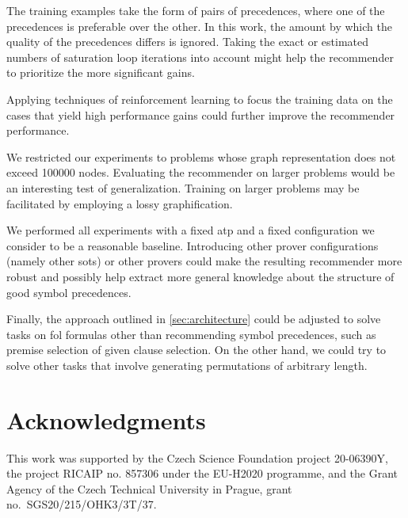 \documentclass[runningheads]{llncs}
\begin{document}
The training examples take the form of pairs of precedences,
where one of the precedences is preferable over the other.
In this work, the amount by which the quality of the precedences differs is ignored.
Taking the exact or estimated numbers of saturation loop iterations into account
might help the recommender to prioritize the more significant gains.

Applying techniques of reinforcement learning to focus the training data on the cases that yield high performance gains
could further improve the recommender performance.

We restricted our experiments to problems whose graph representation does not exceed \num{100000} nodes.
Evaluating the recommender on larger problems would be an interesting test of generalization.
Training on larger problems may be facilitated by employing a lossy graphification.

We performed all experiments with a fixed \gls{atp} \Vampire{} and a fixed configuration
we consider to be a reasonable baseline.
Introducing other prover configurations (namely other \glspl{sot})
or other provers could make the resulting recommender more robust
and possibly help extract more general knowledge about the structure of good symbol precedences.

Finally, the approach outlined in \cref{sec:architecture}
could be adjusted to solve tasks on \gls{fol} formulas other than recommending symbol precedences,
such as premise selection of given clause selection.
On the other hand, we could try to solve other tasks that involve generating permutations of arbitrary length.


\section*{Acknowledgments}



This work was supported by
the Czech Science Foundation project 20-06390Y,
the project RICAIP no. 857306 under the EU-H2020 programme,
and
the Grant Agency of the Czech Technical University in Prague, grant\\
no.~SGS20/215/OHK3/3T/37.





%
\end{document}
